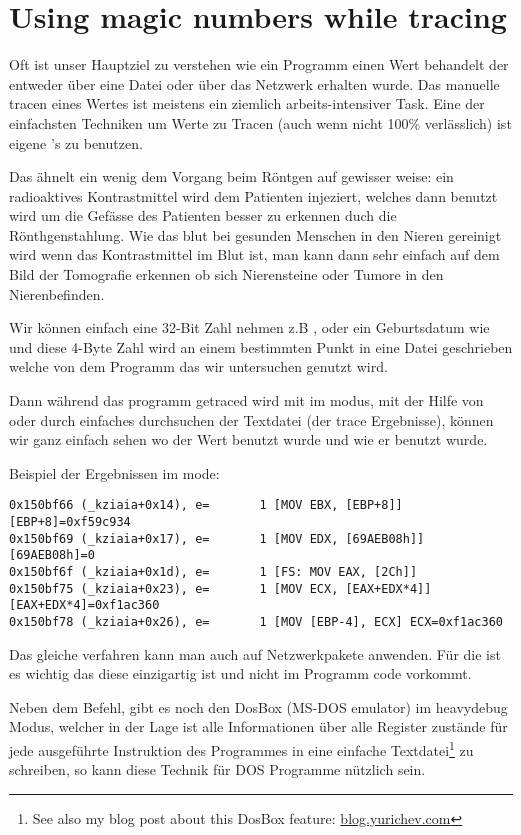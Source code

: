 \section{Using magic numbers while tracing}

Oft ist unser Hauptziel zu verstehen wie ein Programm einen Wert behandelt der entweder \"uber eine Datei oder \"uber das Netzwerk erhalten wurde.
Das manuelle tracen eines Wertes ist meistens ein ziemlich arbeits-intensiver Task. Eine der einfachsten Techniken um Werte zu Tracen (auch wenn nicht 100\% verl\"asslich)
ist eigene 's zu benutzen. 

Das \"ahnelt ein wenig dem Vorgang beim R\"ontgen auf gewisser weise: ein radioaktives Kontrastmittel wird dem Patienten injeziert,
welches dann benutzt wird um die Gef\"asse des Patienten besser zu erkennen duch die R\"onthgenstahlung. Wie das blut bei 
gesunden Menschen in den Nieren gereinigt wird wenn das Kontrastmittel im Blut ist, man kann dann sehr einfach auf dem
Bild der Tomografie erkennen ob sich Nierensteine oder Tumore in den Nierenbefinden. 

Wir k\"onnen einfach eine 32-Bit Zahl nehmen z.B , oder ein Geburtsdatum wie 
und diese 4-Byte Zahl wird an einem bestimmten Punkt in eine Datei geschrieben welche von dem Programm 
das wir untersuchen genutzt wird. 

\myindex{\GrepUsage}

Dann w\"ahrend das programm getraced wird mit \tracer im  modus, mit der Hilfe von 
oder durch einfaches durchsuchen der Textdatei (der trace Ergebnisse), k\"onnen wir ganz einfach sehen wo der 
Wert benutzt wurde und wie er benutzt wurde. 

Beispiel der  \tracer Ergebnissen im  mode:

\begin{lstlisting}[style=customasmx86]
0x150bf66 (_kziaia+0x14), e=       1 [MOV EBX, [EBP+8]] [EBP+8]=0xf59c934 
0x150bf69 (_kziaia+0x17), e=       1 [MOV EDX, [69AEB08h]] [69AEB08h]=0 
0x150bf6f (_kziaia+0x1d), e=       1 [FS: MOV EAX, [2Ch]] 
0x150bf75 (_kziaia+0x23), e=       1 [MOV ECX, [EAX+EDX*4]] [EAX+EDX*4]=0xf1ac360 
0x150bf78 (_kziaia+0x26), e=       1 [MOV [EBP-4], ECX] ECX=0xf1ac360 
\end{lstlisting}

Das gleiche verfahren kann man auch auf Netzwerkpakete anwenden.
F\"ur die  ist es wichtig das diese einzigartig ist und nicht im Programm code vorkommt.

\newcommand{\DOSBOXURL}{\href{http://go.yurichev.com/17222}{blog.yurichev.com}}

Neben dem \tracer Befehl, gibt es noch den DosBox (MS-DOS emulator) im heavydebug Modus,
welcher in der Lage ist alle Informationen \"uber alle Register zust\"ande f\"ur jede ausgef\"uhrte Instruktion des Programmes in
eine einfache Textdatei\footnote{See also my blog post about this DosBox feature: \DOSBOXURL{}} zu schreiben, so kann
diese Technik f\"ur DOS Programme n\"utzlich sein. 

